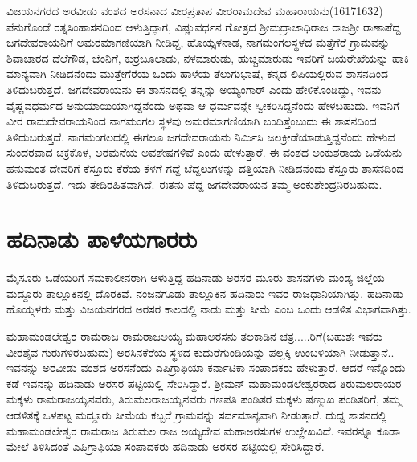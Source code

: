 ವಿಜಯನಗರದ ಅರವೀಡು ವಂಶದ ಅರಸನಾದ ವೀರಪ್ರತಾಪ ವೀರರಾಮದೇವ ಮಹಾರಾಯನು(16171632) ಪೆನುಗೊಂಡೆ ರತ್ನಸಿಂಹಾಸನದಿಂದ ಆಳುತ್ತಿದ್ದಾಗ, ವಿಷ್ಣುವರ್ಧನ ಗೋತ್ರದ ಶ‍್ರೀಮದ್ರಾಜಾಧಿರಾಜ ರಾಜಶ‍್ರೀ ರಾಣಾಪೆದ್ದ ಜಗದೇವರಾಯನಿಗೆ ಅಮರಮಾಗಣಿಯಾಗಿ ನೀಡಿದ್ದ, ಹೊಯ್ಸಳನಾಡ, ನಾಗಮಂಗಲಸ್ಥಳದ ಮತ್ತೆಗೆರೆ ಗ್ರಾಮವನ್ನು ಶಿವಾಚಾರದ ದೆಲೆಗೌಡ, ಜೆಂನಿಗೆ, ಕುರ್ರಬೂಲಾಡು, ನಳಮಾರುಡು, ಹುಚ್ಚಮಾರುಡು ಇವರಿಗೆ ಜಯರೇಖೆಯನ್ನು ಹಾಕಿ ಮಾನ್ಯವಾಗಿ ನೀಡಿದನೆಂದು ಮುತ್ತೇಗೆರೆಯ ಒಂದು ಹಾಳೆಯ ತೆಲುಗುಭಾಷೆ, ಕನ್ನಡ ಲಿಪಿಯಲ್ಲಿರುವ ಶಾಸನದಿಂದ ತಿಳಿದುಬರುತ್ತದೆ. ಜಗದೇವರಾಯನು ಈ ಶಾಸನದಲ್ಲಿ ತನ್ನನ್ನು ಅಯ್ಯಂಗಾರ್​ ಎಂದು ಹೇಳಿಕೊಂಡಿದ್ದು, ಇವನು ವೈಷ್ಣವಧರ್ಮದ ಅನುಯಾಯಿ\-ಯಾಗಿದ್ದನೆಂದು ಅಥವಾ ಆ ಧರ್ಮವನ್ನೇ ಸ್ವೀಕರಿಸಿದ್ದನೆಂದು ಹೇಳಬಹುದು. ಇವನಿಗೆ ವೀರ ರಾಮದೇವರಾಯನಿಂದ ನಾಗಮಂಗಲ ಸ್ಥಳವು ಅಮರಮಾಗಣಿಯಾಗಿ ಬಂದಿತ್ತೆಂಬುದು ಈ ಶಾಸನದಿಂದ ತಿಳಿದುಬರುತ್ತದೆ. ನಾಗಮಂಗಲದಲ್ಲಿ ಈಗಲೂ ಜಗದೇವರಾಯನು ನಿರ್ಮಿಸಿ ಜಲಕ್ರೀಡೆಯಾಡುತ್ತಿದ್ದನೆಂದು ಹೇಳುವ ಸುಂದರವಾದ ಚಕ್ರಕೊಳ, ಅರಮನೆಯ ಅವಶೇಷಗಳಿವೆ ಎಂದು ಹೇಳುತ್ತಾರೆ. ಈ ವಂಶದ ಅಂಕುಶರಾಯ ಒಡೆಯನು ಹನುಮಂತ ದೇವರಿಗೆ ಕೆಸ್ತೂರು ಕೆರೆಯ ಕೆಳಗೆ ಗದ್ದೆ ಬೆದ್ದಲುಗಳನ್ನು ದತ್ತಿಯಾಗಿ ನೀಡಿದನೆಂದು ಕೆಸ್ತೂರು ಶಾಸನದಿಂದ ತಿಳಿದುಬರುತ್ತದೆ. ಇದು ತೇದಿರಹಿತವಾಗಿದೆ. ಈತನು ಪೆದ್ದ ಜಗದೇವರಾಯನ ತಮ್ಮ ಅಂಕುಶೇಂದ್ರನಿರಬಹುದು.


\section{ಹದಿನಾಡು ಪಾಳೆಯಗಾರರು}

ಮೈಸೂರು ಒಡೆಯರಿಗೆ ಸಮಕಾಲೀನರಾಗಿ ಆಳುತ್ತಿದ್ದ ಹದಿನಾಡು ಅರಸರ ಮೂರು ಶಾಸನಗಳು ಮಂಡ್ಯ ಜಿಲ್ಲೆಯ ಮದ್ದೂರು ತಾಲ್ಲೂಕಿನಲ್ಲಿ ದೊರಕಿವೆ. ನಂಜನಗೂಡು ತಾಲ್ಲೂಕಿನ ಹದಿನಾರು ಇವರ ರಾಜಧಾನಿಯಾಗಿತ್ತು. ಹದಿನಾಡು ಹೊಯ್ಸಳರು ಮತ್ತು ವಿಜಯನಗರದ ಅರಸರ ಕಾಲದಲ್ಲಿ ನಾಡು ಮತ್ತು ಸೀಮೆ ಎಂಬ ಒಂದು ಆಡಳಿತ ವಿಭಾಗವಾಗಿತ್ತು.

ಮಹಾಮಂಡಲೇಶ್ವರ ರಾಮರಾಜ ರಾಮರಾಜಅಯ್ಯ ಮಹಾಅರಸನು ತಲಕಾಡಿನ ಚತ್ರ.....ರಿಗೆ(ಬಹುಶಃ ಇವರು ವೀರಶೈವ ಗುರುಗಳಿರಬಹುದು) ಅರಸಿನಕೆರೆಯ ಸ್ಥಳದ ಕುದುರೆಗುಂಡಿಯನ್ನು ಪಲ್ಲಕ್ಕಿ ಉಂಬಳಿಯಾಗಿ ನೀಡುತ್ತಾನೆ.. ಇವನನ್ನು ಅರವೀಡು ವಂಶದ ಅರಸನೆಂದು ಎಪಿಗ್ರಾಫಿಯಾ ಕರ್ನಾಟಿಕಾ ಸಂಪಾದಕರು ಹೇಳುತ್ತಾರೆ. ಆದರೆ ಇನ್ನೊಂದು ಕಡೆ ಇವನನ್ನು ಹದಿನಾಡು ಅರಸರ ಪಟ್ಟಿಯಲ್ಲಿ ಸೇರಿಸಿದ್ದಾರೆ. ಶ‍್ರೀಮನ್​ ಮಹಾಮಂಡಲೇಶ್ವರರಾದ ತಿರುಮಲರಾಯರ ಮಕ್ಕಳು ರಾಮರಾಜಯ್ಯನವರು, ತಿರುಮಲರಾಜಯ್ಯನವರು ಗಣಪತಿ ಪಂಡಿತರ ಮಕ್ಕಳು ಷಣ್ಮುಖ ಪಂಡಿತರಿಗೆ, ತಮ್ಮ ಆಡಳಿತಕ್ಕೆ ಒಳಪಟ್ಟ ಮದ್ದೂರು ಸೀಮೆಯ ಕಬ್ಬರೆ ಗ್ರಾಮವನ್ನು ಸರ್ವಮಾನ್ಯವಾಗಿ ನೀಡುತ್ತಾರೆ. ದುದ್ದ ಶಾಸನದಲ್ಲಿ ಮಹಾಮಂಡಲೇಶ್ವರ ರಾಮರಾಜ ತಿರುಮಲ ರಾಜ ಅಯ್ಯದೇವ ಮಹಾಅರಸುಗಳ ಉಲ್ಲೇಖವಿದೆ. ಇವರನ್ನೂ ಕೂಡಾ ಮೇಲೆ ತಿಳಿಸಿದಂತೆ ಎಪಿಗ್ರಾಫಿಯಾ ಸಂಪಾದಕರು ಹದಿನಾಡು ಅರಸರ ಪಟ್ಟಿಯಲ್ಲಿ ಸೇರಿಸಿದ್ದಾರೆ.

